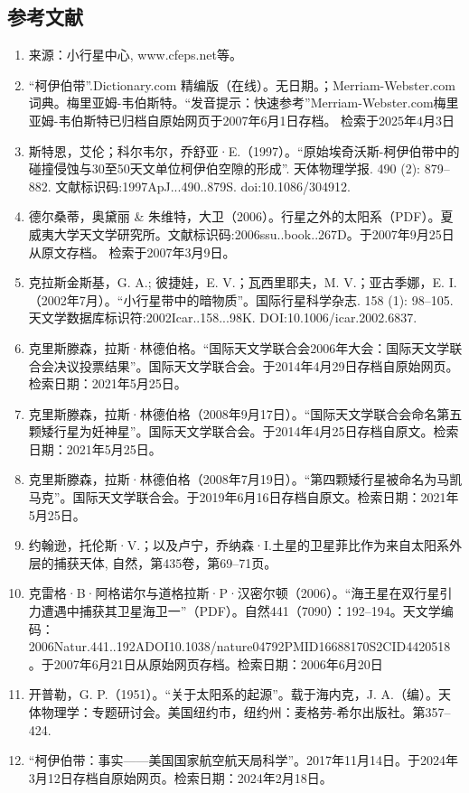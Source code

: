 \subsection{参考文献}
\begin{enumerate}
\item 来源：小行星中心, www.cfeps.net等。
\item “柯伊伯带”.Dictionary.com 精编版（在线）。无日期。；Merriam-Webster.com 词典。梅里亚姆-韦伯斯特。“发音提示：快速参考”Merriam-Webster.com梅里亚姆-韦伯斯特已归档自原始网页于2007年6月1日存档。 检索于2025年4月3日
\item 斯特恩，艾伦；科尔韦尔，乔舒亚·E.（1997）。“原始埃奇沃斯-柯伊伯带中的碰撞侵蚀与30至50天文单位柯伊伯空隙的形成”. 天体物理学报. 490 (2): 879–882. 文献标识码:1997ApJ...490..879S. doi:10.1086/304912.
\item 德尔桑蒂，奥黛丽 & 朱维特，大卫（2006）。行星之外的太阳系（PDF）。夏威夷大学天文学研究所。文献标识码:2006ssu..book..267D。于2007年9月25日从原文存档。 检索于2007年3月9日。
\item 克拉斯金斯基，G. A.; 彼捷娃，E. V.；瓦西里耶夫，M. V.；亚古季娜，E. I. （2002年7月）。“小行星带中的暗物质”。国际行星科学杂志. 158 (1): 98–105. 天文学数据库标识符:2002Icar..158...98K. DOI:10.1006/icar.2002.6837.
\item 克里斯滕森，拉斯·林德伯格。“国际天文学联合会2006年大会：国际天文学联合会决议投票结果”。国际天文学联合会。于2014年4月29日存档自原始网页。检索日期：2021年5月25日。
\item 克里斯滕森，拉斯·林德伯格（2008年9月17日）。“国际天文学联合会命名第五颗矮行星为妊神星”。国际天文学联合会。于2014年4月25日存档自原文。检索日期：2021年5月25日。
\item 克里斯滕森，拉斯·林德伯格（2008年7月19日）。“第四颗矮行星被命名为马凯马克”。国际天文学联合会。于2019年6月16日存档自原文。检索日期：2021年5月25日。
\item 约翰逊，托伦斯·V.；以及卢宁，乔纳森·I.土星的卫星菲比作为来自太阳系外层的捕获天体, 自然，第435卷，第69–71页。
\item 克雷格·B·阿格诺尔与道格拉斯·P·汉密尔顿（2006）。“海王星在双行星引力遭遇中捕获其卫星海卫一”（PDF）。自然441（7090）：192–194。天文学编码：2006Natur.441..192ADOI10.1038/nature04792PMID16688170S2CID4420518。于2007年6月21日从原始网页存档。检索日期：2006年6月20日
\item 开普勒，G. P.（1951）。“关于太阳系的起源”。载于海内克，J. A.（编）。天体物理学：专题研讨会。美国纽约市，纽约州：麦格劳-希尔出版社。第357–424.
\item “柯伊伯带：事实——美国国家航空航天局科学”。2017年11月14日。于2024年3月12日存档自原始网页。检索日期：2024年2月18日。

\end{enumerate}
